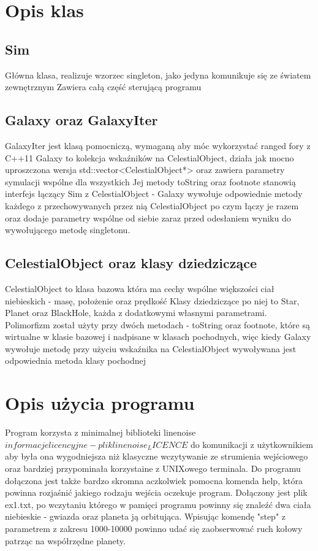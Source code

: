 \documentclass{article}
\begin{document}
\begin{center}
\section{Opis klas}
\subsection{Sim}
Główna klasa, realizuje wzorzec singleton, jako jedyna komunikuje się ze światem zewnętrznym
Zawiera całą część sterującą programu
\subsection{Galaxy oraz GalaxyIter}
GalaxyIter jest klasą pomocniczą, wymaganą aby móc wykorzystać ranged fory z C++11
Galaxy to kolekcja wskaźników na CelestialObject, działa jak mocno uproszczona wersja std::vector<CelestialObject*> oraz zawiera parametry symulacji wspólne dla wszystkich
Jej metody toString\(\) oraz footnote\(\) stanowią interfejs łączący Sim z CelestialObject - Galaxy wywołuje odpowiednie metody każdego z przechowywanych przez nią CelestialObject po czym łączy je razem oraz dodaje parametry wspólne od siebie zaraz przed odesłaniem wyniku do wywołującego metodę singletonu.
\subsection{CelestialObject oraz klasy dziedziczące}
CelestialObject to klasa bazowa która ma cechy wspólne większości ciał niebieskich - masę, położenie oraz prędkość
Klasy dziedziczące po niej to Star, Planet oraz BlackHole, każda z dodatkowymi własnymi parametrami.
Polimorfizm został użyty przy dwóch metodach - toString\(\) oraz footnote\(\), które są wirtualne w klasie bazowej i nadpisane w klasach pochodnych, więc kiedy Galaxy wywołuje metodę przy użyciu wskaźnika na CelestialObject wywoływana jest odpowiednia metoda klasy pochodnej
\section{Opis użycia programu}
Program korzysta z minimalnej biblioteki linenoise \(informacje licencyjne - plik linenoise_LICENCE\) do komunikacji z użytkownikiem aby była ona wygodniejsza niż klasyczne wczytywanie ze strumienia wejściowego oraz bardziej przypominała korzystaine z UNIXowego terminala. Do programu dołączona jest także bardzo skromna aczkolwiek pomocna komenda help, która powinna rozjaśnić jakiego rodzaju wejścia oczekuje program.
Dołączony jest plik ex1.txt, po wczytaniu którego w pamięci programu powinny się znaleźć dwa ciała niebieskie - gwiazda oraz planeta ją orbitująca. Wpisując komendę "step" z parametrem z zakresu 1000-10000 powinno udać się zaobserwować ruch kołowy patrząc na współrzędne planety.

\end{center}
\end{document}
